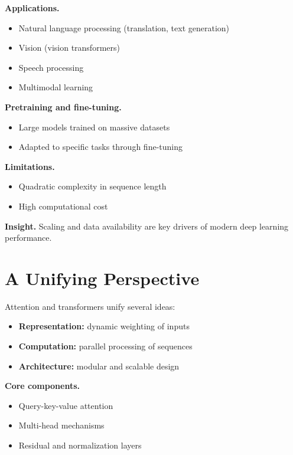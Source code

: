 \medskip

\noindent
\textbf{Applications.}
\begin{itemize}
    \item Natural language processing (translation, text generation)
    \item Vision (vision transformers)
    \item Speech processing
    \item Multimodal learning
\end{itemize}

\medskip

\noindent
\textbf{Pretraining and fine-tuning.}
\begin{itemize}
    \item Large models trained on massive datasets
    \item Adapted to specific tasks through fine-tuning
\end{itemize}

\medskip

\noindent
\textbf{Limitations.}
\begin{itemize}
    \item Quadratic complexity in sequence length
    \item High computational cost
\end{itemize}

\medskip

\noindent
\textbf{Insight.}  
Scaling and data availability are key drivers of modern deep learning performance.

\section{A Unifying Perspective}

Attention and transformers unify several ideas:

\begin{itemize}
    \item \textbf{Representation:} dynamic weighting of inputs
    \item \textbf{Computation:} parallel processing of sequences
    \item \textbf{Architecture:} modular and scalable design
\end{itemize}

\medskip

\noindent
\textbf{Core components.}
\begin{itemize}
    \item Query-key-value attention
    \item Multi-head mechanisms
    \item Residual and normalization layers
\end{itemize}


